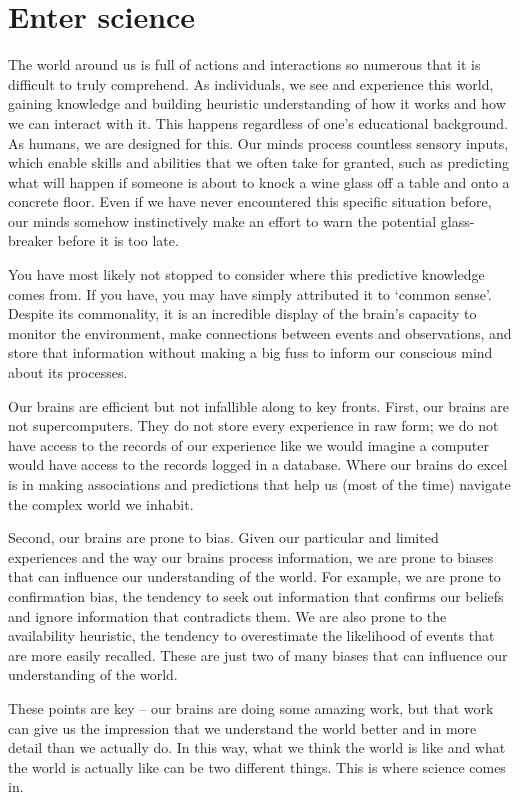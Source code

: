 \documentclass[
  letterpaper,
  DIV=11,
  numbers=noendperiod]{scrreprt}
\theoremstyle{definition}
\theoremstyle{remark}
\begin{document}
\section{Enter science}\label{sec-enter-science}

The world around us is full of actions and interactions so numerous that
it is difficult to truly comprehend. As individuals, we see and
experience this world, gaining knowledge and building heuristic
understanding of how it works and how we can interact with it. This
happens regardless of one's educational background. As humans, we are
designed for this. Our minds process countless sensory inputs, which
enable skills and abilities that we often take for granted, such as
predicting what will happen if someone is about to knock a wine glass
off a table and onto a concrete floor. Even if we have never encountered
this specific situation before, our minds somehow instinctively make an
effort to warn the potential glass-breaker before it is too late.

You have most likely not stopped to consider where this predictive
knowledge comes from. If you have, you may have simply attributed it to
`common sense'. Despite its commonality, it is an incredible display of
the brain's capacity to monitor the environment, make connections
between events and observations, and store that information without
making a big fuss to inform our conscious mind about its processes.

Our brains are efficient but not infallible along to key fronts. First,
our brains are not supercomputers. They do not store every experience in
raw form; we do not have access to the records of our experience like we
would imagine a computer would have access to the records logged in a
database. Where our brains do excel is in making associations and
predictions that help us (most of the time) navigate the complex world
we inhabit.

Second, our brains are prone to bias. Given our particular and limited
experiences and the way our brains process information, we are prone to
biases that can influence our understanding of the world. For example,
we are prone to confirmation bias, the tendency to seek out information
that confirms our beliefs and ignore information that contradicts them.
We are also prone to the availability heuristic, the tendency to
overestimate the likelihood of events that are more easily recalled.
These are just two of many biases that can influence our understanding
of the world.

These points are key -- our brains are doing some amazing work, but that
work can give us the impression that we understand the world better and
in more detail than we actually do. In this way, what we think the world
is like and what the world is actually like can be two different things.
This is where science comes in.
\end{document}

